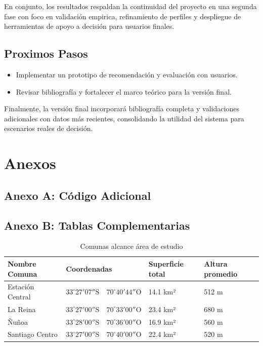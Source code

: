 \documentclass[11pt,letterpaper]{article}
\begin{document}
En conjunto, los resultados respaldan la continuidad del proyecto en una segunda fase con foco en validación empirica, refinamiento de perfiles y despliegue de herramientas de apoyo a decisión para usuarios finales.

\subsection{Proximos Pasos}
\begin{itemize}
    \item Implementar un prototipo de recomendación y evaluación con usuarios.
    \item Revisar bibliografía y fortalecer el marco teórico para la versión final.
\end{itemize}

Finalmente, la versión final incorporará bibliografía completa y validaciones adicionales con datos más recientes, consolidando la utilidad del sistema para escenarios reales de decisión.
\appendix
\section{Anexos}

\subsection{Anexo A: Código Adicional}


\subsection{Anexo B: Tablas Complementarias}

\begin{table}[H]
\centering
\caption{Comunas alcance área de estudio}
\label{tab:comunas}
\begin{tabular}{@{}llll@{}}
\toprule
\textbf{Nombre Comuna} & \textbf{Coordenadas} & \textbf{Superficie total} & \textbf{Altura promedio}\\
\midrule 
Estación Central & $33^\circ 27' 07''\mathrm{S} \quad 70^\circ 40' 44''\mathrm{O}$ & 14.1 km² & 512 m\\
La Reina &  $33^\circ 27' 00''\mathrm{S} \quad 70^\circ 33' 00''\mathrm{O}$ & 23.4 km² & 680 m\\
Ñuñoa &  $33^\circ 28' 00''\mathrm{S} \quad 70^\circ 36' 00''\mathrm{O}$ & 16.9 km² & 560 m\\
Santiago Centro &  $33^\circ 27' 00''\mathrm{S} \quad 70^\circ 40' 00''\mathrm{O}$ & 22.4 km² & 520 m\\
\bottomrule
\end{tabular}
\end{table}
\end{document}
